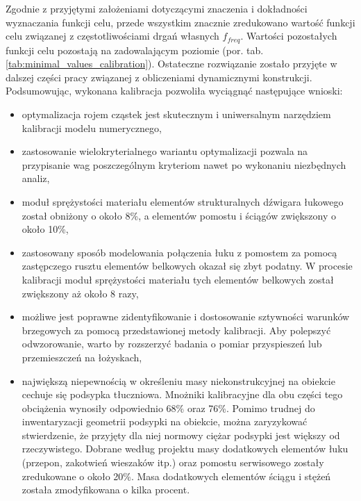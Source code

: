 Zgodnie z przyjętymi założeniami dotyczącymi znaczenia i dokładności wyznaczania funkcji celu, przede wszystkim znacznie zredukowano wartość funkcji celu związanej z częstotliwościami drgań własnych $f_{freq}$. Wartości pozostałych funkcji celu pozostają na zadowalającym poziomie (por. tab. \ref{tab:minimal_values_calibration}). Ostateczne rozwiązanie zostało przyjęte w dalszej części pracy związanej z obliczeniami dynamicznymi konstrukcji. Podsumowując, wykonana kalibracja pozwoliła wyciągnąć następujące wnioski:
\begin{itemize}
	\item optymalizacja rojem cząstek jest skutecznym i uniwersalnym narzędziem kalibracji modelu numerycznego,
	\item zastosowanie wielokryterialnego wariantu optymalizacji pozwala na przypisanie wag poszczególnym kryteriom nawet po wykonaniu niezbędnych analiz,
	\item moduł sprężystości materiału elementów strukturalnych dźwigara łukowego został obniżony o około 8\%, a elementów pomostu i ściągów zwiększony o około 10\%,
	\item zastosowany sposób modelowania połączenia łuku z pomostem za pomocą zastępczego rusztu elementów belkowych okazał się zbyt podatny. W procesie kalibracji moduł sprężystości materiału tych elementów belkowych został zwiększony aż około 8 razy,
	\item możliwe jest poprawne zidentyfikowanie i dostosowanie sztywności warunków brzegowych za pomocą przedstawionej metody kalibracji. Aby polepszyć odwzorowanie, warto by rozszerzyć badania o pomiar przyspieszeń lub przemieszczeń na łożyskach,
	\item największą niepewnością w określeniu masy niekonstrukcyjnej na obiekcie cechuje się podsypka tłuczniowa. Mnożniki kalibracyjne dla obu części tego obciążenia wynosiły odpowiednio 68\% oraz 76\%. Pomimo trudnej do inwentaryzacji geometrii podsypki na obiekcie, można zaryzykować stwierdzenie, że przyjęty dla niej normowy ciężar podsypki jest większy od rzeczywistego. Dobrane według projektu masy dodatkowych elementów łuku (przepon, zakotwień wieszaków itp.) oraz pomostu serwisowego zostały zredukowane o około 20\%. Masa dodatkowych elementów ściągu i stężeń została zmodyfikowana o kilka procent.
\end{itemize}


